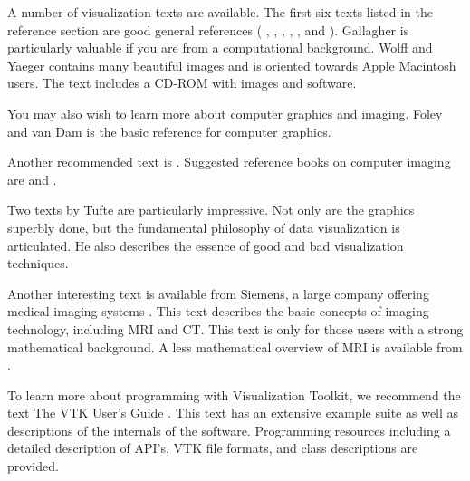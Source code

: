 A number of visualization texts are available. The first six texts listed in the reference section are good general references ( \cite{Nielson90}, \cite{Patrikalakis91}, \cite{Brodlie92}, \cite{Wolff93}, \cite{Rosenblum94}, and\cite{Gallagher95} ). Gallagher \cite{Gallagher95} is particularly valuable if you are from a computational background. Wolff and Yaeger \cite{Wolff93} contains many beautiful images and is oriented towards Apple Macintosh users. The text includes a CD-ROM with images and software.

You may also wish to learn more about computer graphics and imaging. Foley and van Dam\cite{FoleyVanDam90} is the basic reference for computer graphics. 

Another recommended text is \cite{BurgerGillies89}. Suggested reference books on computer imaging are \cite{Pavlidis82} and \cite{Wolberg90}.

Two texts by Tufte \cite{Tufte83} \cite{Tufte90} are particularly impressive. Not only are the graphics superbly done, but the fundamental philosophy of data visualization is articulated. He also describes the essence of good and bad visualization techniques.

Another interesting text is available from Siemens, a large company offering medical imaging systems \cite{Krestel90}. This text describes the basic concepts of imaging technology, including MRI and CT. This text is only for those users with a strong mathematical background. A less mathematical
overview of MRI is available from \cite{SmithRanallo89}.

To learn more about programming with Visualization Toolkit, we recommend the text The VTK User’s Guide \cite{UsersGuide}. This text has an extensive example suite as well as descriptions of
the internals of the software. Programming resources including a detailed description of API’s, VTK file formats, and class descriptions are provided.

\printbibliography
